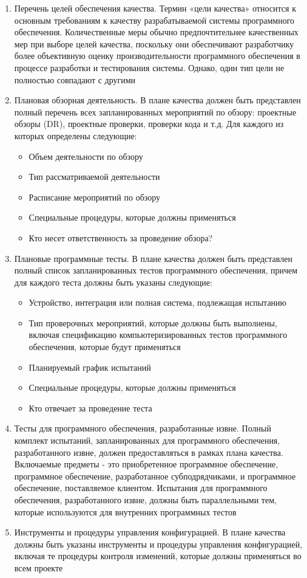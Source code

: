 \documentclass{../industrial-development}
\begin{document}
 	 \begin{enumerate}
\item Перечень целей обеспечения качества. Термин «цели качества» относится к основным требованиям к качеству разрабатываемой системы программного обеспечения. Количественные меры обычно предпочтительнее качественных мер при выборе целей качества, поскольку они обеспечивают разработчику более объективную оценку производительности программного обеспечения в процессе разработки и тестирования системы. Однако, один тип цели не полностью совпадают с другими
\item  Плановая обзорная деятельность. В плане качества должен быть представлен полный перечень всех запланированных мероприятий по обзору: проектные обзоры (DR), проектные проверки, проверки кода и т.д. Для каждого из которых определены следующие:
	 	 \begin{itemize}
	\item Объем деятельности по обзору
	\item Тип рассматриваемой деятельности
	\item Расписание мероприятий по обзору
	\item Специальные процедуры, которые должны применяться
	\item Кто несет ответственность за проведение обзора?
	  	\end{itemize}
\item Плановые программные тесты. В плане качества должен быть представлен полный список запланированных тестов программного обеспечения, причем для каждого теста должны быть указаны следующие:
	 	 \begin{itemize}
	\item Устройство, интеграция или полная система, подлежащая испытанию
	\item Тип проверочных мероприятий, которые должны быть выполнены, включая спецификацию компьютеризированных тестов программного обеспечения, которые будут применяться
	\item Планируемый график испытаний
	\item Специальные процедуры, которые должны применяться
	\item Кто отвечает за проведение теста
	  	\end{itemize}
\item Тесты для программного обеспечения, разработанные извне. Полный комплект испытаний, запланированных для программного обеспечения, разработанного извне, должен предоставляться в рамках плана качества. Включаемые предметы - это приобретенное программное обеспечение, программное обеспечение, разработанное субподрядчиками, и программное обеспечение, поставляемое клиентом. Испытания для программного обеспечения, разработанного извне, должны быть параллельными тем, которые используются для внутренних программных тестов
\item Инструменты и процедуры управления конфигурацией. В плане качества должны быть указаны инструменты и процедуры управления конфигурацией, включая те процедуры контроля изменений, которые должны применяться во всем проекте~\cite[с.~101--103]{SQA-Galin}
  	\end{enumerate}
\end{document}
